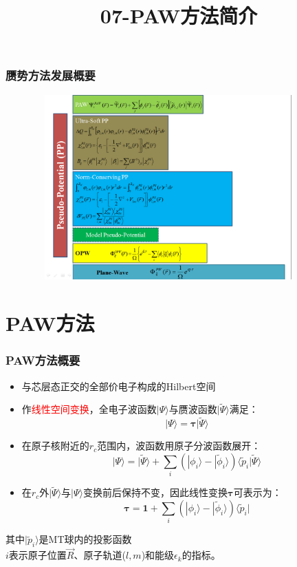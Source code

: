 \frame
{
	\frametitle{赝势方法发展概要}
\begin{figure}[h!]
\centering
\vspace*{-0.25in}
\includegraphics[height=2.80in,width=4.10in,viewport=0 0 1190 875,clip]{Figures/Pseudo_Potential.png}
\label{Pseudo_Poential}
\end{figure}
}

\title{07-\rm{PAW}方法简介}
\section{\rm{PAW}方法}
\frame
{
	\frametitle{\textrm{PAW}方法概要}
\begin{itemize}
	\item 与芯层态正交的全部价电子构成的\textrm{Hilbert}空间%
	\item 作\textcolor{red}{线性空间变换}，全电子波函数$|\Psi\rangle$与赝波函数$|\tilde\Psi\rangle$满足：
		$$|\Psi\rangle=\mathbf{\tau|}\tilde\Psi\rangle$$
	\item 在原子核附近的$r_c$范围内，波函数用原子分波函数展开：
	$$|\Psi\rangle=|\tilde\Psi\rangle+\sum_i(|\phi_i\rangle-|\tilde\phi_i\rangle)\langle\tilde p_i|\tilde\Psi\rangle$$
	\item 在$r_c$外$|\tilde\Psi\rangle$与$|\Psi\rangle$变换前后保持不变，因此线性变换$\mathbf{\tau}$可表示为：
	$$\mathbf{\tau}=\mathbf{1}+\sum_i(|\phi_i\rangle-|\tilde\phi_i\rangle)\langle\tilde p_i|$$
\end{itemize}
其中$|\tilde p_i\rangle$是\textrm{MT}球内的投影函数\\
$i$表示原子位置$\vec R$、原子轨道($l,m$)和能级$\epsilon_k$的指标。
}

